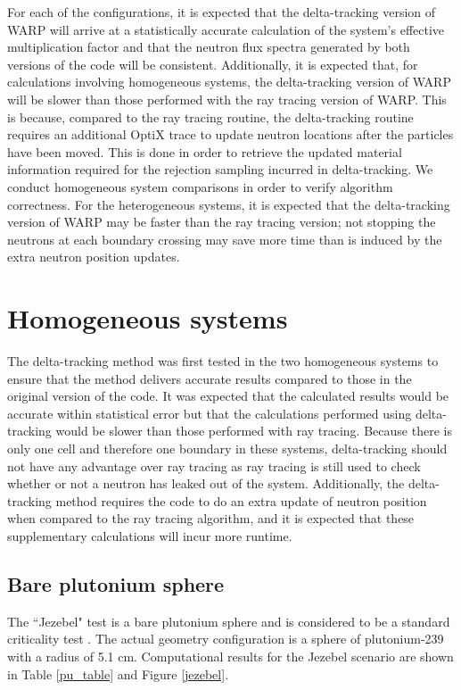 For each of the configurations, it is expected that the delta-tracking version of WARP will arrive at a
statistically accurate calculation of the system's effective multiplication factor and that the neutron 
flux spectra generated by both versions of the code will be consistent. Additionally, it is expected that,
for calculations involving homogeneous systems, the delta-tracking version of WARP will be slower than
those performed with the ray tracing version of WARP. This is because, compared to the ray tracing 
routine, the delta-tracking routine requires an additional OptiX trace to update neutron locations after 
the particles have been moved. This is done in order to retrieve the updated material information required
for the rejection sampling incurred in delta-tracking. We conduct homogeneous system comparisons in order
to verify algorithm correctness. For the heterogeneous systems, it is expected that
the delta-tracking version of WARP may be faster than the ray tracing version; not stopping the neutrons
at each boundary crossing may save more time than is induced by the extra neutron position updates.

\section{Homogeneous systems}
\label{sec:homog}

The delta-tracking method was first tested in the two homogeneous systems to ensure that the method
delivers accurate results compared to those in the original version of the code. It was expected that the
calculated results would be accurate within statistical error but that the calculations performed using
delta-tracking would be slower than those performed with ray tracing. Because there is only one cell and
therefore one boundary in these systems, delta-tracking should not have any advantage over ray tracing as
ray tracing is still used to check whether or not a neutron has leaked out of the system. Additionally,
the delta-tracking method requires the code to do an extra update of neutron position when compared to the
ray tracing algorithm, and it is expected that these supplementary calculations will incur more runtime.

\subsection{Bare plutonium sphere}

The ``Jezebel" test is a bare plutonium sphere and is considered to be a standard criticality test 
\cite{nea1995}. The actual geometry configuration is a sphere of plutonium-239 with a radius of 5.1 cm.
Computational results for the Jezebel scenario are shown in Table \ref{pu_table} and Figure \ref{jezebel}.

